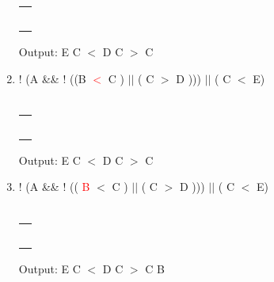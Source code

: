 \documentclass[a4paper]{article}
\begin{document}
\begin{large}
\begin{enumerate}
          \begin{tabular}[t]{ | p{1.6em} | }
            \makecell{ }      \\ \hline
            \makecell{)}      \\ \hline
            \makecell{$||$}   \\ \hline
            \makecell{)}      \\ \hline
            \makecell{)}      \\ \hline
            \makecell{ $||$ } \\ \hline
          \end{tabular}
          \hspace{2em}
          Output: E C $<$ D C $>$ C
    \item
          ! (A \&\& ! ((B   \textcolor{red}{$<$} C ) $||$ ( C $>$ D ))) $||$ ( C $<$ E)\\
          \\
          \begin{tabular}[t]{ | p{1.6em} | }
            \makecell{$<$}    \\ \hline
            \makecell{)}      \\ \hline
            \makecell{$||$}   \\ \hline
            \makecell{)}      \\ \hline
            \makecell{)}      \\ \hline
            \makecell{ $||$ } \\ \hline
          \end{tabular}
          \hspace{2em}
          Output: E C $<$ D C $>$ C
          \newpage
    \item
          ! (A \&\& ! (( \textcolor{red}{B} $<$ C ) $||$ ( C $>$ D ))) $||$ ( C $<$ E)\\
          \\
          \begin{tabular}[t]{ | p{1.6em} | }
            \makecell{$<$}    \\ \hline
            \makecell{)}      \\ \hline
            \makecell{$||$}   \\ \hline
            \makecell{)}      \\ \hline
            \makecell{)}      \\ \hline
            \makecell{ $||$ } \\ \hline
          \end{tabular}
          \hspace{2em}
          Output: E C $<$ D C $>$ C B


\end{enumerate}
\end{large}
\end{document}
